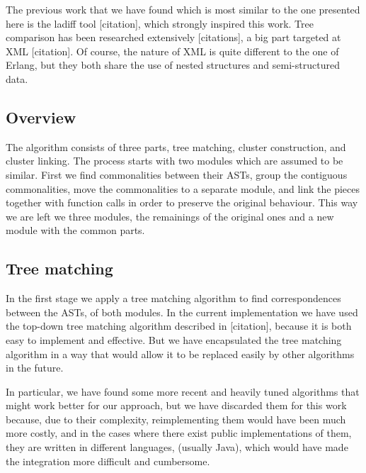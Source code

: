 The previous work that we have found which is most similar to the
one presented here is the ladiff tool {[}citation{]}, which strongly
inspired this work. Tree comparison has been researched extensively
{[}citations{]}, a big part targeted at XML {[}citation{]}. Of course,
the nature of XML is quite different to the one of Erlang, but they
both share the use of nested structures and semi-structured data.


\subsection{Overview}

The algorithm consists of three parts, tree matching, cluster construction,
and cluster linking. The process starts with two modules which are
assumed to be similar. First we find commonalities between their ASTs,
group the contiguous commonalities, move the commonalities to a separate
module, and link the pieces together with function calls in order
to preserve the original behaviour. This way we are left we three
modules, the remainings of the original ones and a new module with
the common parts.


\subsection{Tree matching\label{sub:tree-matching}}

In the first stage we apply a tree matching algorithm to find correspondences
between the ASTs, of both modules. In the current implementation we
have used the top-down tree matching algorithm described in {[}citation{]},
because it is both easy to implement and effective. But we have encapsulated
the tree matching algorithm in a way that would allow it to be replaced
easily by other algorithms in the future.

In particular, we have found some more recent and heavily tuned algorithms
that might work better for our approach, but we have discarded them
for this work because, due to their complexity, reimplementing them
would have been much more costly, and in the cases where there exist
public implementations of them, they are written in different languages,
(usually Java), which would have made the integration more difficult
and cumbersome.

